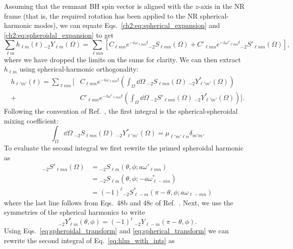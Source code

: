 Assuming that the remnant BH spin vector is aligned with the $z$-axis in the NR frame (that is, the required rotation has been applied to the NR spherical-harmonic modes), we can equate Eqs.~\ref{ch2:eq:spherical_expansion} and \ref{ch2:eq:spheroidal_expansion} to get
\begin{equation}
    \sum_{\ell m} h_{\ell m}(t) {}_{-2}Y_{\ell m}(\Omega) = \sum_{\ell m n} \left[ C_{\ell m n} e^{-i \omega_{\ell m n} t} {}_{-2}S_{\ell m n}(\Omega) + C'_{\ell m n} e^{-i \omega'_{\ell m n} t} {}_{-2}S'_{\ell m n}(\Omega) \right],
\end{equation}
where we have dropped the limits on the sums for clarity.
We can then extract $h_{\ell m}$ using spherical-harmonic orthogonality:
\begin{align}\label{eq:hlm_with_ints}
    h_{\ell' m'}(t) = \sum_{\ell m n} \bigg[ &C_{\ell m n} e^{-i \omega_{\ell m n} t} \left(\int_\Omega \dd{\Omega} ~ {}_{-2}S_{\ell m n}(\Omega) ~ {}_{-2}Y^*_{\ell' m'}(\Omega)\right) \nonumber \\
    + &C'_{\ell m n} e^{-i \omega'_{\ell m n} t} \left(\int_\Omega \dd{\Omega} ~ {}_{-2}S'_{\ell m n}(\Omega) ~ {}_{-2}Y^*_{\ell' m'}(\Omega)\right) \bigg].
\end{align}
Following the convention of Ref.~\cite{Stein:2019mop}, the first integral is the spherical-spheroidal mixing coefficient:
\begin{equation}\label{ch2:eq:mu}
    \int_\Omega \dd{\Omega} ~ {}_{-2}S_{\ell m n}(\Omega) ~ {}_{-2}Y^*_{\ell' m'}(\Omega) = \mu_{\ell' m' \ell n} \delta_{m' m}.
\end{equation}
To evaluate the second integral we first rewrite the primed spheroidal harmonic as 
\begin{align}\label{eq:spheroidal_transform}
    {}_{-2}S'_{\ell m n}(\Omega) &= {}_{-2}S_{\ell m}(\theta, \phi; a\omega'_{\ell m n}) \nonumber \\
    &= {}_{-2}S_{\ell m}(\theta, \phi; -a\omega^*_{\ell -m n}) \nonumber \\
    &= (-1)^\ell {}_{-2}S^*_{\ell -m}(\pi - \theta, \phi; a\omega_{\ell -m n})
\end{align}
where the last line follows from Eqs.~48b and 48c of Ref.~\cite{Cook:2014cta}.
Next, we use the symmetries of the spherical harmonics to write
\begin{equation}\label{eq:spherical_transform}
    {}_{-2}Y^*_{\ell m}(\theta, \phi) = (-1)^{\ell} ~ {}_{-2}Y_{\ell -m}(\pi - \theta, \phi).
\end{equation}
Using Eqs.~\ref{eq:spheroidal_transform} and \ref{eq:spherical_transform} we can rewrite the second integral of Eq.~\ref{eq:hlm_with_ints} as
